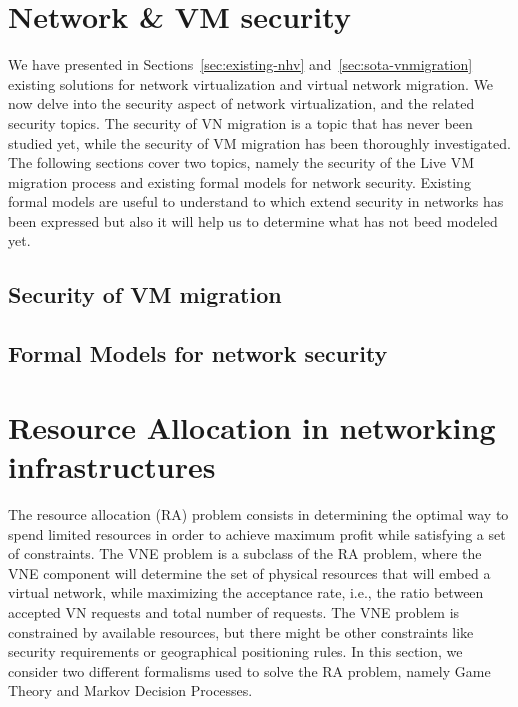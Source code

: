 \documentclass[a4paper, 11pt]{report}
\newcommand{\ie}{i.e.,\xspace}
\theoremstyle{definition}
\begin{document}




\newpage
\section{Network \& VM security}

We have presented in Sections~\ref{sec:existing-nhv} and~\ref{sec:sota-vnmigration} existing solutions for network virtualization and virtual network migration. We now delve into the security aspect of network virtualization, and the related security topics. The security of VN migration is a topic that has never been  studied yet, while the security of VM migration has been thoroughly investigated. The following sections cover two topics, namely the security of the Live VM migration process and existing formal models for network security.
Existing formal models are useful to understand to which extend security in networks has been expressed but also it will help us to determine what has not beed modeled yet.

\subsection{Security of VM migration}



\subsection{Formal Models for network security}



\newpage
\section{Resource Allocation in networking infrastructures}
The resource allocation (RA) problem consists in determining the optimal way to spend limited resources in order to achieve maximum profit while satisfying a set of constraints.
The VNE problem is a subclass of the RA problem, where the VNE component will determine the set of physical resources that will embed a virtual network, while maximizing the acceptance rate, \ie the ratio between accepted VN requests and total number of requests.
The VNE problem is constrained by available resources, but there might be other constraints like security requirements or geographical positioning rules.
In this section, we consider two different formalisms used to solve the RA problem, namely Game Theory and Markov Decision Processes. 
\end{document}
